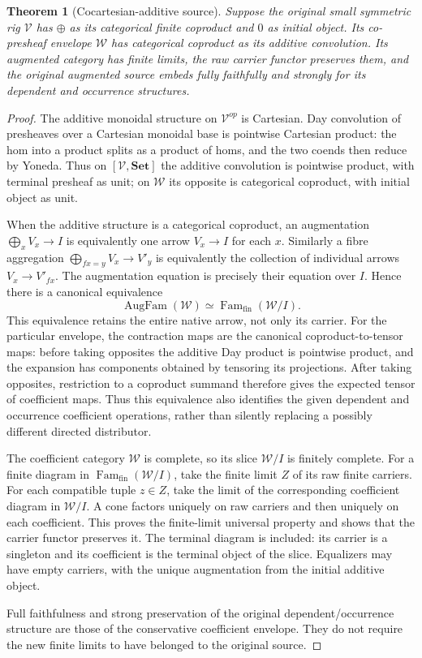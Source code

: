 \documentclass[11pt]{article}
\newtheorem{theorem}{Theorem}
\newcommand{\V}{\mathcal V}
\newcommand{\W}{\mathcal W}
\newcommand{\Aug}{\operatorname{AugFam}}
\newcommand{\Fam}{\operatorname{Fam}_{\mathrm{fin}}}
\begin{document}
\begin{theorem}[Cocartesian-additive source]
Suppose the original small symmetric rig $\V$ has $\oplus$ as its categorical finite coproduct and $0$ as initial object. Its co-presheaf envelope $\W$ has categorical coproduct as its additive convolution. Its augmented category has finite limits, the raw carrier functor preserves them, and the original augmented source embeds fully faithfully and strongly for its dependent and occurrence structures.
\end{theorem}
\begin{proof}
The additive monoidal structure on $\V^{op}$ is Cartesian. Day convolution of presheaves over a Cartesian monoidal base is pointwise Cartesian product: the hom into a product splits as a product of homs, and the two coends then reduce by Yoneda. Thus on $[\V,\mathbf{Set}]$ the additive convolution is pointwise product, with terminal presheaf as unit; on $\W$ its opposite is categorical coproduct, with initial object as unit.

When the additive structure is a categorical coproduct, an augmentation $\bigoplus_xV_x\to I$ is equivalently one arrow $V_x\to I$ for each $x$. Similarly a fibre aggregation $\bigoplus_{fx=y}V_x\to V'_y$ is equivalently the collection of individual arrows $V_x\to V'_{fx}$. The augmentation equation is precisely their equation over $I$. Hence there is a canonical equivalence
\[
 \Aug(\W)\simeq\Fam(\W/I).
\]
This equivalence retains the entire native arrow, not only its carrier. For the particular envelope, the contraction maps are the canonical coproduct-to-tensor maps: before taking opposites the additive Day product is pointwise product, and the expansion has components obtained by tensoring its projections. After taking opposites, restriction to a coproduct summand therefore gives the expected tensor of coefficient maps. Thus this equivalence also identifies the given dependent and occurrence coefficient operations, rather than silently replacing a possibly different directed distributor.

The coefficient category $\W$ is complete, so its slice $\W/I$ is finitely complete. For a finite diagram in $\Fam(\W/I)$, take the finite limit $Z$ of its raw finite carriers. For each compatible tuple $z\in Z$, take the limit of the corresponding coefficient diagram in $\W/I$. A cone factors uniquely on raw carriers and then uniquely on each coefficient. This proves the finite-limit universal property and shows that the carrier functor preserves it. The terminal diagram is included: its carrier is a singleton and its coefficient is the terminal object of the slice. Equalizers may have empty carriers, with the unique augmentation from the initial additive object.

Full faithfulness and strong preservation of the original dependent/occurrence structure are those of the conservative coefficient envelope. They do not require the new finite limits to have belonged to the original source.
\end{proof}
\end{document}
